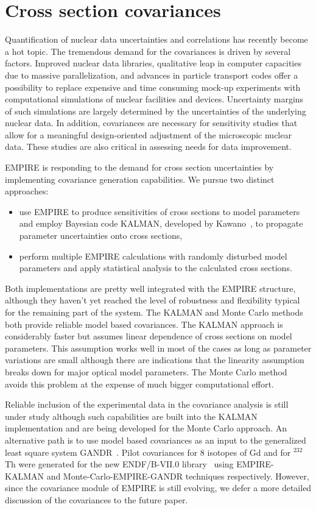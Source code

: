 \documentclass[twocolumn,amsmath,amssymb,10pt,groupedaddress,a4paper]{revtex4}
\begin{document}
\section{Cross section covariances}
Quantification of nuclear data uncertainties and correlations has recently become a hot topic. The tremendous demand for the covariances is driven by several factors.  Improved nuclear data libraries, qualitative leap in computer capacities due to massive parallelization, and advances in particle transport codes offer a possibility to replace expensive and time consuming mock-up experiments with computational simulations of nuclear facilities and devices. Uncertainty margins of such simulations are largely determined by the uncertainties of the underlying nuclear data. In addition, covariances are necessary for sensitivity studies that allow for a meaningful design-oriented adjustment of the microscopic nuclear data. These studies are also critical in assessing needs for data improvement.

EMPIRE is responding to the demand for cross section uncertainties by implementing covariance generation capabilities. We pursue two distinct approaches:
\begin{itemize}
\item use EMPIRE to produce sensitivities of cross sections to model parameters and employ Bayesian code KALMAN, developed by Kawano~\cite{Kawano:97}, to propagate parameter uncertainties onto cross sections,
\item perform multiple EMPIRE calculations with randomly disturbed model parameters and apply statistical analysis to the calculated cross sections.
\end{itemize}

Both implementations are pretty well integrated with the EMPIRE structure, although they haven't yet reached the level of robustness and flexibility typical for the remaining part of the system. The KALMAN and Monte Carlo methods both provide reliable model based covariances. The KALMAN approach is considerably faster but assumes linear dependence of cross sections on model parameters. This assumption works well in most of the cases as long as parameter variations are small although there are indications that the linearity assumption breaks down for major optical model parameters.  The Monte Carlo method avoids this problem at the expense of much bigger computational effort.

Reliable inclusion of the experimental data in the covariance analysis is still under study although such capabilities are built into the KALMAN implementation and are being developed for the Monte Carlo approach.
An alternative path is to use model based covariances as an input to the generalized least square system GANDR~\cite{GANDR}. Pilot covariances for 8 isotopes of Gd and for $^{232}$Th were generated for the new ENDF/B-VII.0 library~\cite{ENDF-VII} using EMPIRE-KALMAN and Monte-Carlo-EMPIRE-GANDR techniques respectively. However, since the covariance module of EMPIRE is still evolving, we defer a more detailed discussion of the covariances to the future paper.
\end{document}
